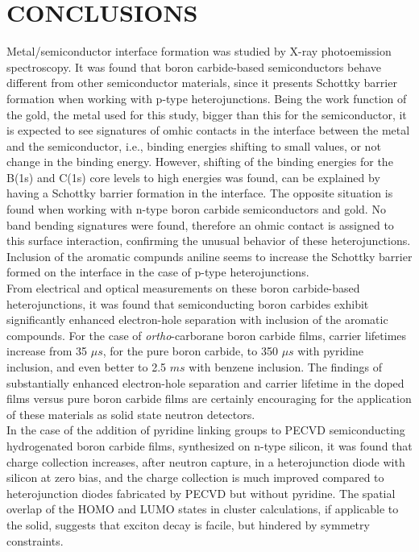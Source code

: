 \chapter{CONCLUSIONS}
\label{ch:Conclusions}

\hspace{1cm} Metal/semiconductor interface formation was studied by X-ray photoemission spectroscopy. It was found that boron carbide-based semiconductors behave different from other semiconductor materials, since it presents Schottky barrier formation when working with p-type heterojunctions. Being the work function of the gold, the metal used for this study, bigger than this for the semiconductor, it is expected to see signatures of omhic contacts in the interface between the metal and the semiconductor, i.e., binding energies shifting to small values, or not change in the binding energy. However, shifting of the binding energies for the B(1s) and C(1s) core levels to high energies was found, can be explained by having a Schottky barrier formation in the interface.  The opposite situation is found when working with n-type boron carbide semiconductors and gold. No band bending signatures were found, therefore an ohmic contact is assigned to this surface interaction, confirming the unusual behavior of these heterojunctions. Inclusion of the aromatic compunds aniline seems to increase the Schottky barrier formed on the interface in the case of p-type heterojunctions. \\ 

\noindent \hspace{1cm} From electrical and optical measurements on these boron carbide-based heterojunctions, it was found that semiconducting boron carbides exhibit significantly enhanced electron-hole separation with inclusion of the aromatic compounds. For the case of \textit{ortho}-carborane boron carbide films, carrier lifetimes increase from 35 $\mu s$, for the pure boron carbide, to 350 $\mu s$ with pyridine inclusion, and even better to 2.5 $ms$ with benzene inclusion. The findings of substantially enhanced electron-hole separation and carrier lifetime in the doped films versus pure boron carbide films are certainly encouraging for the application of these materials as solid state neutron detectors. \\

\noindent \hspace{1cm} In the case of the addition of pyridine linking groups to PECVD semiconducting hydrogenated boron carbide films, synthesized on n-type silicon, it was found that charge collection increases, after neutron capture, in a heterojunction diode with silicon at zero bias, and the charge collection is much improved compared to heterojunction diodes fabricated by PECVD but without pyridine. The spatial overlap of the HOMO and LUMO states in cluster calculations, if applicable to the solid, suggests that exciton decay is facile, but hindered by symmetry constraints. \\ %


